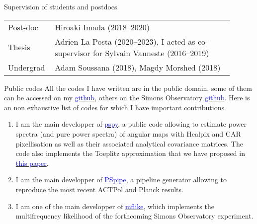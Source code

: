 \documentclass{resume} %
\newcommand{\TIB}[1]{\textcolor{blue}{#1}}
\begin{document}
\begin{rSection}{Supervision of	students and postdocs}
\vspace{-0.4cm}

\begin{table}[h]
{\def\arraystretch{1.5}\tabcolsep=0pt
\begin{tabular}{p{0.15\linewidth}p{0.75\linewidth}}
Post-doc  & Hiroaki Imada (2018--2020) \\
Thesis  & Adrien La Posta (2020--2023), I acted as co-supervisor for Sylvain Vanneste (2016--2019) \\
Undergrad   & Adam Soussana (2018), Magdy Morshed (2018) 
\end{tabular}%
}
\end{table}
\vspace{-0.6cm}
\end{rSection}


\begin{rSection}{Public codes}
All the codes I have written are in the public domain, some of them can be accessed on my \href{https://github.com/thibautlouis}{\TIB{github}}, others on the Simons Observatory \href{https://github.com/simonobs}{\TIB{github}}. Here is an non exhaustive list of codes for which I have important contributions 
\begin{enumerate}
\item I am the main developper of \href{https://github.com/simonsobs/pspy}{\TIB{pspy}}, a public code allowing to estimate power spectra (and pure power spectra) of angular maps with Healpix and CAR pixellisation as well as their associated analytical covariance matrices. The code also implements the Toeplitz approximation that we have proposed in \href{https://ui.adsabs.harvard.edu/abs/2020PhRvD.102l3538L/abstract}{\TIB{this paper}}.
\item I am  the main developper of \href{https://github.com/simonsobs/PSpipe}{\TIB{PSpipe}}, a pipeline generator allowing to reproduce the most recent ACTPol and Planck results. 
\item I am one of the main developper of \href{https://github.com/simonsobs/mflike}{\TIB{mflike}}, which implements the multifrequency likelihood of the forthcoming Simons Observatory experiment. 

\end{enumerate}

\end{rSection}
\end{document}
